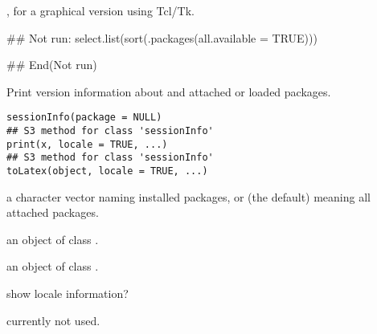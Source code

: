%
\begin{SeeAlso}\relax
{},  for a graphical
version using Tcl/Tk.
\end{SeeAlso}
%
\begin{Examples}
\begin{ExampleCode}
## Not run: 
select.list(sort(.packages(all.available = TRUE)))

## End(Not run)
\end{ExampleCode}
\end{Examples}
%
\begin{Description}\relax
Print version information about \R{} and attached or loaded packages.
\end{Description}
%
\begin{Usage}
\begin{verbatim}
sessionInfo(package = NULL)
## S3 method for class 'sessionInfo'
print(x, locale = TRUE, ...)
## S3 method for class 'sessionInfo'
toLatex(object, locale = TRUE, ...)
\end{verbatim}
\end{Usage}
%
\begin{Arguments}
\begin{ldescription}
\item[\code{package}] a character vector naming installed packages, or 
(the default) meaning all attached packages.
\item[\code{x}] an object of class .
\item[\code{object}] an object of class .
\item[\code{locale}] show locale information?
\item[\code{...}] currently not used.
\end{ldescription}
\end{Arguments}
%
